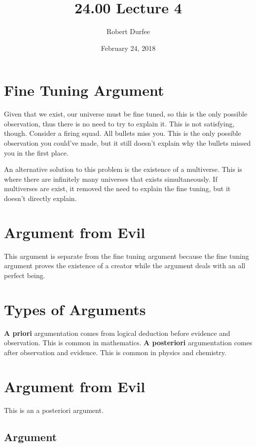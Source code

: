 \documentclass{article}
\title{ 24.00 Lecture 4 }
\author{ Robert Durfee }
\date{ February 24, 2018 }
\begin{document}
\maketitle

\section{ Fine Tuning Argument }

Given that we exist, our universe must be fine tuned, so this is the only
possible observation, thus there is no need to try to explain it. This is not
satisfying, though. Consider a firing squad. All bullets miss you. This is the
only possible observation you could've made, but it still doesn't explain why
the bullets missed you in the first place.

An alternative solution to this problem is the existence of a multiverse. This
is where there are infinitely many universes that exists simultaneously. If
multiverses are exist, it removed the need to explain the fine tuning, but it
doesn't directly explain.

\section{Argument from Evil}

This argument is separate from the fine tuning argument because the fine tuning
argument proves the existence of a creator while the argument deals with an all
perfect being.

\section{Types of Arguments}

\textbf{A priori} argumentation comes from logical deduction before evidence and
observation. This is common in mathematics. \textbf{A posteriori} argumentation
comes after observation and evidence. This is common in physics and chemistry.

\section{Argument from Evil}

This is an a posteriori argument.

\subsection{Argument}
\end{document}
